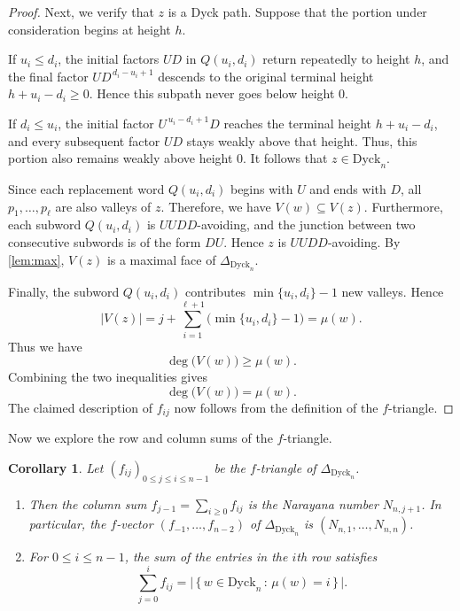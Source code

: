 \documentclass[11pt]{amsart}
\def\Dyck{\mathrm{Dyck}}
\theoremstyle{plain}
\numberwithin{lemma}{\DefaultNumberTheoremWithin}
\numberwithin{theorem}{\DefaultNumberTheoremWithin}
\newtheorem{corollary}{Corollary}
\numberwithin{corollary}{\DefaultNumberTheoremWithin}
\numberwithin{proposition}{\DefaultNumberTheoremWithin}
\numberwithin{conjecture}{\DefaultNumberTheoremWithin}
\theoremstyle{definition}
\numberwithin{definition}{\DefaultNumberTheoremWithin}
\numberwithin{question}{\DefaultNumberTheoremWithin}
\numberwithin{problem}{\DefaultNumberTheoremWithin}
\theoremstyle{remark}
\numberwithin{remark}{\DefaultNumberTheoremWithin}
\numberwithin{example}{\DefaultNumberTheoremWithin}
\numberwithin{claim}{\DefaultNumberTheoremWithin}
\begin{document}
\begin{proof}
Next, we verify that $z$ is a Dyck path. Suppose that the
portion under consideration begins at height $h$.

If $u_i\leq d_i$, the initial factors $UD$ in
$Q(u_i,d_i)$ return repeatedly to height $h$, and the final
factor
$UD^{\,d_i-u_i+1}$
descends to the original terminal height
$h+u_i-d_i\geq0.$
Hence this subpath never goes below height $0$.

If $d_i\leq u_i$, the initial factor
$U^{\,u_i-d_i+1}D$
reaches the terminal height $h+u_i-d_i$, and every subsequent
factor $UD$ stays weakly above that height. Thus, this portion
also remains weakly above height $0$.
It follows that $z\in\Dyck_n$. 

Since each replacement word $Q(u_i,d_i)$ 
begins with $U$ and ends with $D$, all
$p_1,\ldots, p_\ell$ are also valleys of $z$. Therefore,
we have $V(w)\subseteq V(z).$
Furthermore, each subword $Q(u_i,d_i)$ is $UUDD$-avoiding, and the
junction between two consecutive subwords is of the form $DU$.
Hence $z$ is $UUDD$-avoiding. By
\ref{lem:max}, $V(z)$ is a maximal face of
$\Delta_{\Dyck_n}$.

Finally, the subword $Q(u_i,d_i)$ contributes
$\min\{u_i,d_i\}-1$
new valleys. Hence
\[
|V(z)|
=j+\sum_{i=1}^{\ell+1}
\bigl(\min\{u_i,d_i\}-1\bigr)
=\mu(w).
\]
Thus we have
\[
\deg\bigl(V(w)\bigr)\geq\mu(w).
\]
Combining the two inequalities gives
\[
\deg\bigl(V(w)\bigr)=\mu(w).
\]
The claimed description of $f_{ij}$ now follows from the definition of the
$f$-triangle.
\end{proof}



Now we explore the row and column sums of the $f$-triangle.

\begin{corollary}
Let $(f_{ij})_{0\leq j\leq i\leq n-1}$ be the $f$-triangle of
$\Delta_{\Dyck_n}$.

\begin{enumerate}
\item
[(i)]
Then the column sum $f_{j-1} = \displaystyle{\sum_{i \geq 0}} f_{ij}$ is the Narayana number $N_{n,j+1}$.
        In particular, the $f$-vector
        $(f_{-1},\ldots, f_{n-2})$
        of $\Delta_{\Dyck_n}$ is $(N_{n,1},\ldots, N_{n,n})$.

\item
[(ii)]
For $0\leq i\leq n-1$, the sum of the entries in the $i$th row 
satisfies
\[
\sum_{j=0}^{i}f_{ij}
=
\Big|\,\bigl\{\,w\in\Dyck_n\,:\,\mu(w)=i\,\bigr\}\,\Big|.
\] 

\end{enumerate}
\end{corollary}
\end{document}
